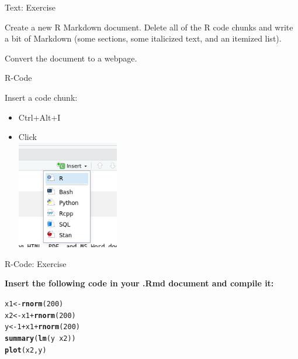 \documentclass[10pt]{beamer}\usepackage[]{graphicx}\usepackage[]{color}
\makeatletter
\newcommand{\hlnum}[1]{\textcolor[rgb]{0.686,0.059,0.569}{#1}}%
\newcommand{\hlopt}[1]{\textcolor[rgb]{0,0,0}{#1}}%
\newcommand{\hlstd}[1]{\textcolor[rgb]{0.345,0.345,0.345}{#1}}%
\newcommand{\hlkwb}[1]{\textcolor[rgb]{0.69,0.353,0.396}{#1}}%
\newcommand{\hlkwd}[1]{\textcolor[rgb]{0.737,0.353,0.396}{\textbf{#1}}}%
\newenvironment{kframe}{%
 \def\at@end@of@kframe{}%
 \ifinner\ifhmode%
  \def\at@end@of@kframe{\end{minipage}}%
  \begin{minipage}{\columnwidth}%
 \fi\fi%
 \def\FrameCommand##1{\hskip\@totalleftmargin \hskip-\fboxsep
 \colorbox{shadecolor}{##1}\hskip-\fboxsep
     \hskip-\linewidth \hskip-\@totalleftmargin \hskip\columnwidth}%
 \MakeFramed {\advance\hsize-\width
   \@totalleftmargin\z@ \linewidth\hsize
   \@setminipage}}%
 {\par\unskip\endMakeFramed%
 \at@end@of@kframe}
\newenvironment{knitrout}{}{} %
\makeatother
\begin{document}
\begin{frame}{Text: Exercise}

Create a new R Markdown document. Delete all of the R code chunks and write a bit of Markdown (some sections, some italicized text, and an itemized list).

Convert the document to a webpage.

\end{frame}

\begin{frame}{R-Code}

Insert a code chunk:
\begin{itemize}
  \item Ctrl+Alt+I
  \item Click \\
    \includegraphics[width=0.35\textwidth]{Figures/chunk}
\end{itemize}
 
\end{frame}

\begin{frame}[fragile]{R-Code: Exercise}

\textbf{Insert the following code in your .Rmd document and compile it:}

\begin{knitrout}\small
{}\color{fgcolor}\begin{kframe}
\begin{alltt}
\hlstd{x1} \hlkwb{<-} \hlkwd{rnorm}\hlstd{(}\hlnum{200}\hlstd{)}
\hlstd{x2} \hlkwb{<-} \hlstd{x1} \hlopt{+}\hlkwd{rnorm}\hlstd{(}\hlnum{200}\hlstd{)}
\hlstd{y} \hlkwb{<-} \hlnum{1} \hlopt{+} \hlstd{x1} \hlopt{+}\hlkwd{rnorm}\hlstd{(}\hlnum{200}\hlstd{)}
\hlkwd{summary}\hlstd{(}\hlkwd{lm}\hlstd{(y} \hlopt{~} \hlstd{x2))}
\hlkwd{plot}\hlstd{(x2, y)}
\end{alltt}
\end{kframe}
\end{knitrout}

\end{frame}
\end{document}
